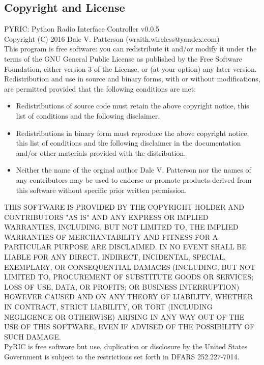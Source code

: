 \documentclass[11pt]{article}
\begin{document}
\begin{appendices}
\section{Copyright and License}\label{sec:copy}
PYRIC: Python Radio Interface Controller v0.0.5\\

Copyright (C) 2016  Dale V. Patterson (wraith.wireless@yandex.com)\\

This program is free software: you can redistribute it and/or modify it under
the terms of the GNU General Public License\cite{gplv3} as published by the Free
Software Foundation, either version 3 of the License, or (at your option) any 
later version.\\

Redistribution and use in source and binary forms, with or without modifications,
are permitted provided that the following conditions are met:
\begin{itemize}
\item Redistributions of source code must retain the above copyright notice, this
list of conditions and the following disclaimer.
\item Redistributions in binary form must reproduce the above copyright notice,
this list of conditions and the following disclaimer in the documentation and/or 
other materials provided with the distribution.
\item Neither the name of the orginal author Dale V. Patterson nor the names of 
any contributors may be used to endorse or promote products derived from this 
software without specific prior written permission.
\end{itemize}

THIS SOFTWARE IS PROVIDED BY THE COPYRIGHT HOLDER AND CONTRIBUTORS "AS IS" AND
ANY EXPRESS OR IMPLIED WARRANTIES, INCLUDING, BUT NOT LIMITED TO, THE IMPLIED
WARRANTIES OF MERCHANTABILITY AND FITNESS FOR A PARTICULAR PURPOSE ARE DISCLAIMED.
IN NO EVENT SHALL BE LIABLE FOR ANY DIRECT, INDIRECT, INCIDENTAL, SPECIAL,
EXEMPLARY, OR CONSEQUENTIAL DAMAGES (INCLUDING, BUT NOT LIMITED TO, PROCUREMENT
OF SUBSTITUTE GOODS OR SERVICES; LOSS OF USE, DATA, OR PROFITS; OR BUSINESS
INTERRUPTION) HOWEVER CAUSED AND ON ANY THEORY OF LIABILITY, WHETHER IN CONTRACT,
STRICT LIABILITY, OR TORT (INCLUDING NEGLIGENCE OR OTHERWISE) ARISING IN ANY WAY
OUT OF THE USE OF THIS SOFTWARE, EVEN IF ADVISED OF THE POSSIBILITY OF SUCH DAMAGE.\\

PyRIC is free software but use, duplication or disclosure by the United States
Government is subject to the restrictions set forth in DFARS 252.227-7014.\\


\end{appendices}
\end{document}
